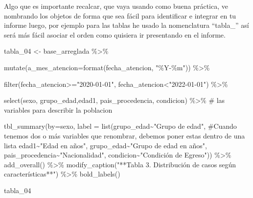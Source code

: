 \documentclass[
  letterpaper,
  DIV=11,
  numbers=noendperiod]{scrreprt}
\newenvironment{Shaded}{\begin{snugshade}}{\end{snugshade}}
\newcommand{\AttributeTok}[1]{\textcolor[rgb]{0.40,0.45,0.13}{#1}}
\newcommand{\CommentTok}[1]{\textcolor[rgb]{0.37,0.37,0.37}{#1}}
\newcommand{\FunctionTok}[1]{\textcolor[rgb]{0.28,0.35,0.67}{#1}}
\newcommand{\NormalTok}[1]{\textcolor[rgb]{0.00,0.23,0.31}{#1}}
\newcommand{\OtherTok}[1]{\textcolor[rgb]{0.00,0.23,0.31}{#1}}
\newcommand{\SpecialCharTok}[1]{\textcolor[rgb]{0.37,0.37,0.37}{#1}}
\newcommand{\StringTok}[1]{\textcolor[rgb]{0.13,0.47,0.30}{#1}}
\begin{document}
Algo que es importante recalcar, que vaya usando como buena práctica, ve
nombrando los objetos de forma que sea fácil para identificar e integrar
en tu informe luego, por ejemplo para las tablas he usado la
nomenclatura ``tabla\_'' así será más fácil asociar el orden como
quisiera ir presentando en el informe.

\begin{Shaded}
\begin{Highlighting}[]
\NormalTok{tabla\_04 }\OtherTok{\textless{}{-}}\NormalTok{ base\_arreglada }\SpecialCharTok{\%\textgreater{}\%} 
  
\FunctionTok{mutate}\NormalTok{(}\AttributeTok{a\_mes\_atencion=}\FunctionTok{format}\NormalTok{(fecha\_atencion, }\StringTok{"\%Y{-}\%m"}\NormalTok{)) }\SpecialCharTok{\%\textgreater{}\%} 
 
   \FunctionTok{filter}\NormalTok{(fecha\_atencion}\SpecialCharTok{\textgreater{}=}\StringTok{"2020{-}01{-}01"}\NormalTok{, fecha\_atencion}\SpecialCharTok{\textless{}}\StringTok{"2022{-}01{-}01"}\NormalTok{) }\SpecialCharTok{\%\textgreater{}\%} 
  
  \FunctionTok{select}\NormalTok{(sexo, grupo\_edad,edad1, pais\_procedencia, condicion) }\SpecialCharTok{\%\textgreater{}\%}  \CommentTok{\# las variables para describir la poblacion}

  \FunctionTok{tbl\_summary}\NormalTok{(}\AttributeTok{by=}\NormalTok{sexo,}
             \AttributeTok{label =} \FunctionTok{list}\NormalTok{(grupo\_edad}\SpecialCharTok{\textasciitilde{}}\StringTok{"Grupo de edad"}\NormalTok{, }\CommentTok{\#Cuando tenemos dos o más variables que renombrar, debemos poner estas dentro de una lista}
\NormalTok{              edad1}\SpecialCharTok{\textasciitilde{}}\StringTok{"Edad en años"}\NormalTok{,}
\NormalTok{              grupo\_edad}\SpecialCharTok{\textasciitilde{}}\StringTok{"Grupo de edad en años"}\NormalTok{,}
\NormalTok{              pais\_procedencia}\SpecialCharTok{\textasciitilde{}}\StringTok{"Nacionalidad"}\NormalTok{,}
\NormalTok{              condicion}\SpecialCharTok{\textasciitilde{}}\StringTok{"Condición de Egreso"}\NormalTok{)) }\SpecialCharTok{\%\textgreater{}\%} 
  \FunctionTok{add\_overall}\NormalTok{() }\SpecialCharTok{\%\textgreater{}\%} 
  \FunctionTok{modify\_caption}\NormalTok{(}\StringTok{"**Tabla 3. Distribución de casos según características**"}\NormalTok{) }\SpecialCharTok{\%\textgreater{}\%} 
  \FunctionTok{bold\_labels}\NormalTok{()}

\NormalTok{tabla\_04}
\end{Highlighting}
\end{Shaded}
\end{document}
